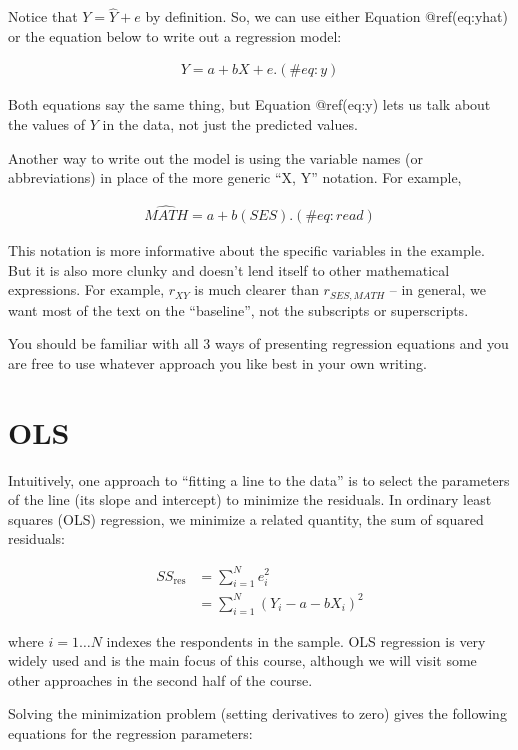 \documentclass[
  letterpaper,
  DIV=11,
  numbers=noendperiod]{scrreprt}
\begin{document}
Notice that \(Y = \widehat Y + e\) by definition. So, we can use either
Equation @ref(eq:yhat) or the equation below to write out a regression
model:

\begin{align} 
Y = a + bX + e.  
(\#eq:y)
\end{align}

Both equations say the same thing, but Equation @ref(eq:y) lets us talk
about the values of \(Y\) in the data, not just the predicted values.

Another way to write out the model is using the variable names (or
abbreviations) in place of the more generic ``X, Y'' notation. For
example,

\begin{align} 
\widehat {MATH} = a + b(SES). 
(\#eq:read)
\end{align}

This notation is more informative about the specific variables in the
example. But it is also more clunky and doesn't lend itself to other
mathematical expressions. For example, \(r_{XY}\) is much clearer than
\(r_{SES, MATH}\) -- in general, we want most of the text on the
``baseline'', not the subscripts or superscripts.

You should be familiar with all 3 ways of presenting regression
equations and you are free to use whatever approach you like best in
your own writing.

\hypertarget{ols-2}{%
\section{OLS}\label{ols-2}}

Intuitively, one approach to ``fitting a line to the data'' is to select
the parameters of the line (its slope and intercept) to minimize the
residuals. In ordinary least squares (OLS) regression, we minimize a
related quantity, the sum of squared residuals:

\[
\begin{align} 
SS_{\text{res}} & = \sum_{i=1}^{N} e_i^2 \\ 
& = \sum_{i=1}^{N} (Y_i - a - b X_i)^2 
\end{align} 
\]

where \(i = 1 \dots N\) indexes the respondents in the sample. OLS
regression is very widely used and is the main focus of this course,
although we will visit some other approaches in the second half of the
course.

Solving the minimization problem (setting derivatives to zero) gives the
following equations for the regression parameters:
\end{document}
